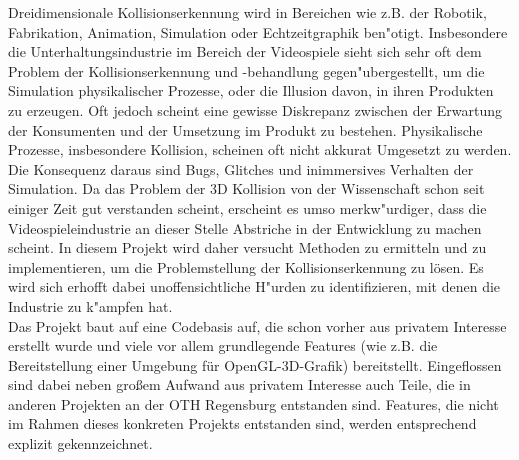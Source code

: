 
Dreidimensionale Kollisionserkennung wird in Bereichen wie z.B. der Robotik, Fabrikation, Animation, Simulation oder Echtzeitgraphik ben"otigt.
Insbesondere die Unterhaltungsindustrie im Bereich der Videospiele sieht sich sehr oft dem Problem der Kollisionserkennung und -behandlung gegen"ubergestellt, um die Simulation physikalischer Prozesse, oder die Illusion davon, in ihren Produkten zu erzeugen.
Oft jedoch scheint eine gewisse Diskrepanz zwischen der Erwartung der Konsumenten und der Umsetzung im Produkt zu bestehen. Physikalische Prozesse, insbesondere Kollision, scheinen oft nicht akkurat Umgesetzt zu werden. Die Konsequenz daraus sind Bugs, Glitches und inimmersives Verhalten der Simulation.
Da das Problem der 3D Kollision von der Wissenschaft schon seit einiger Zeit gut verstanden scheint, erscheint es umso merkw"urdiger, dass die Videospieleindustrie an dieser Stelle Abstriche in der Entwicklung zu machen scheint.
In diesem Projekt wird daher versucht Methoden zu ermitteln und zu implementieren, um die Problemstellung der Kollisionserkennung zu lösen.
Es wird sich erhofft dabei unoffensichtliche H"urden zu identifizieren, mit denen die Industrie zu k"ampfen hat. \\
Das Projekt baut auf eine Codebasis auf, die schon vorher aus privatem Interesse erstellt wurde und viele vor allem grundlegende Features (wie z.B. die Bereitstellung einer Umgebung für OpenGL-3D-Grafik) bereitstellt. Eingeflossen sind dabei neben großem Aufwand aus privatem Interesse auch Teile, die in anderen Projekten an der OTH Regensburg entstanden sind. Features, die nicht im Rahmen dieses konkreten Projekts entstanden sind, werden entsprechend explizit gekennzeichnet.